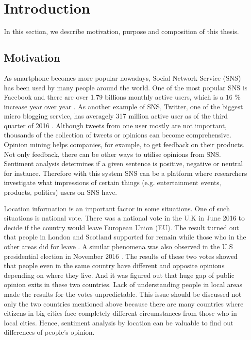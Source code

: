 \chapter{Introduction}
In this section, we describe motivation, purpose and composition of this thesis.

\section{Motivation} \label{sec:motivation}
As smartphone becomes more popular nowadays, Social Network Service (SNS) has been used by many people around the world.
One of the most popular SNS is Facebook and there are over 1.79 billions monthly active users, which is a 16 \% increase year over year \cite{facebook_user}.
As another example of SNS, Twitter, one of the biggest micro blogging service, has averagely 317 million active user as of the third quarter of 2016 \cite{twitter_user}.
Although tweets from one user mostly are not important, thousands of the collection of tweets or opinions can become comprehensive.
Opinion mining helps companies, for example, to get feedback on their products.
Not only feedback, there can be other ways to utilise opinions from SNS.
Sentiment analysis determines if a given sentence is positive, negative or neutral for instance.
Therefore with this system SNS can be a platform where researchers investigate what impressions of certain things (e.g. entertainment events, products, politics) users on SNS have.


Location information is an important factor in some situations.
One of such situations is national vote.
There was a national vote in the U.K in June 2016 to decide if the country would leave European Union (EU).
The result turned out that people in London and Scotland supported for remain while those who in the other areas did for leave \cite{uk_referendum}.
A similar phenomena was also observed in the U.S presidential election in November 2016 \cite{us_map}.
The results of these two votes showed that people even in the same country have different and opposite opinions depending on where they live.
And it was figured out that huge gap of public opinion exits in these two countries.
Lack of understanding people in local areas made the results for the votes unpredictable.
This issue should be discussed not only the two countries mentioned above because there are many countries where citizens in big cities face completely different circumstances from those who in local cities.
Hence, sentiment analysis by location can be valuable to find out differences of people's opinion. 

